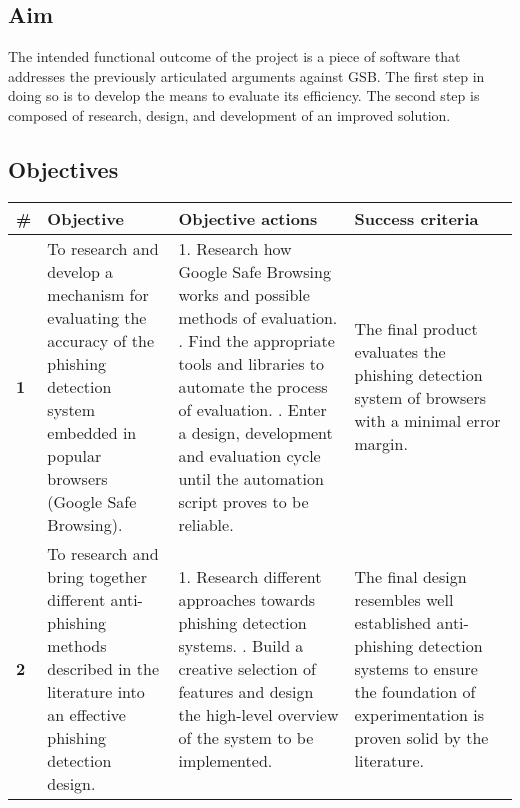 \subsection{Aim}
\label{subsec:aim}
The intended functional outcome of the project is a piece of software that addresses the previously articulated arguments against GSB. The first step in doing so is to develop the means to evaluate its efficiency. The second step is composed of research, design, and development of an improved solution.

\begin{landscape}
	\begin{singlespace}
		\subsection{Objectives}
		\begin{center}
			\label{tab:OBJECTIVES}
			\begin{tabular}{ | m{0.5em} | m{18.5em} | m{23em}| m{16em} | }
				\hline
				\textbf{\#} & \textbf{Objective} & \textbf{Objective actions} &
				\textbf{Success criteria}                                                                                                                                  \\
				\hline
				\textbf{1}  &
				To research and develop a mechanism for evaluating the
				accuracy of the phishing detection system embedded in popular
				browsers (Google Safe Browsing).
				            &
				1. Research how Google Safe Browsing works and possible methods of evaluation.		\newline\newline
				2. Find the appropriate tools and libraries to automate the
				process of evaluation.
				\newline\newline
				2. Enter a design, development and evaluation cycle until the
				automation script proves to be reliable.
				            &
				The final product evaluates the phishing detection system of
				browsers with a minimal error margin.                                                                                                                      \\


				\hline
				\textbf{2}  &
				To research and bring together different anti-phishing methods
				described in the literature into an effective phishing
				detection design.
				            &
				1. Research different approaches towards phishing detection
				systems.
				\newline\newline
				2. Build a creative selection of features and design the high-level overview of the system to be implemented.
				            &
				The final design resembles well established anti-phishing detection systems to ensure the foundation of experimentation is proven solid by the literature. \\



\end{tabular}
\end{center}
\end{singlespace}
\end{landscape}
